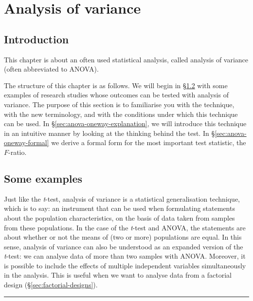 \documentclass[
]{book}
\begin{document}
\hypertarget{ch-anova}{%
\chapter{Analysis of variance}\label{ch-anova}}

\hypertarget{sec:introduction}{%
\section{Introduction}\label{sec:introduction}}

This chapter is about an often used statistical analysis, called
analysis of variance (often abbreviated to ANOVA).

The structure of this chapter is as follows. We will begin in §\ref{sec:anova-examples}
with some examples of research studies whose outcomes
can be tested with analysis of variance. The purpose of this section
is to familiarise you with the technique,
with the new terminology, and with the conditions under which this technique
can be used. In §\ref{sec:anova-oneway-explanation}, we will introduce this technique
in an intuitive manner by looking at the thinking behind the test. In
§\ref{sec:anova-oneway-formal} we derive a formal form for the most important
test statistic, the \(F\)-ratio.

\hypertarget{sec:anova-examples}{%
\section{Some examples}\label{sec:anova-examples}}

Just like the \emph{t}-test, analysis of variance is a statistical generalisation
technique, which is to say: an instrument that can be used
when formulating statements about the population characteristics,
on the basis of data taken from samples from these populations.
In the case of the \emph{t}-test and ANOVA, the statements are about
whether or not the means of (two or more) populations are equal.
In this sense, analysis of variance can also be understood as an
expanded version of the \emph{t}-test: we can analyse data
of more than two samples with ANOVA. Moreover, it is possible to include the effects
of multiple independent variables simultaneously in the analysis. This is useful
when we want to analyse data from a factorial design
(§\ref{sec:factorial-designs}).

\begin{center}\rule{0.5\linewidth}{0.5pt}\end{center}
\end{document}
